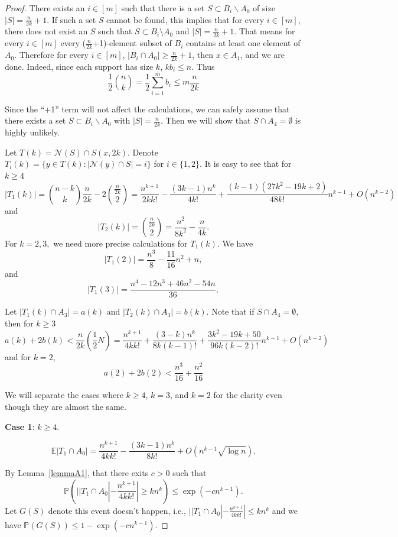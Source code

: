 \documentclass[reqno,11pt]{amsart}
\renewcommand{\leq}{\leqslant}
\renewcommand{\geq}{\geqslant}
\begin{document}
\begin{proof}
There exists an $i \in [m]$ such that there is a set $S \subset B_i \backslash A_0$ of size $|S|=\frac{n}{2k}+1$. If such a set $S$ cannot be found, this implies that for every $i \in [m]$, there does not exist an $S$ such that $S \subset B_i \setminus A_0$ and $|S|=\frac{n}{2k}+1$. That means for every $i \in [m]$ every ($\frac{n}{2k}$+1)-element subset of $B_i$ contains at least one element of $A_0$. Therefore for every $i \in [m]$, $|B_i \cap A_0| \geq \frac{n}{2k}+1$, then $x \in A_1$, and we are done. Indeed, since each support has size $k$, $kb_i \leq n$. Thus 
$$\frac{1}{2}\binom{n}{k}=\frac{1}{2}\sum_{i=1}^mb_i \leq m\frac{n}{2k}$$


Since the ``+1'' term will not affect the calculations, we can safely assume that there exists a set $S \subset B_i \backslash A_0$ with $|S|=\frac{n}{2k}$. Then we will show that $S \cap A_4 = \emptyset$ is highly unlikely.


Let $T(k)=\mathcal{N}(S) \cap S(x,2k)$. Denote $T_i(k)=\{y \in T(k): |\mathcal{N}(y) \cap S|=i\}$ for $i\in \{1,2\}$. It is easy to see that for $k \geq 4$
$$|T_1(k)|=\binom{n-k}{k}\frac{n}{2k}-2\binom{\frac{n}{2k}}{2}=\frac{n^{k+1}}{2k k!}-\frac{(3k-1)n^k}{4k!}+\frac{(k-1)(27k^2-19k+2)}{48k!}n^{k-1}+O(n^{k-2})$$ and 
$$|T_2(k)|=\binom{\frac{n}{2k}}{2}=\frac{n^2}{8k^2}-\frac{n}{4k}.$$
For $k=2,3,$ we need more precise calculations for $T_1(k)$. We have 
$$|T_1(2)|=\frac{n^3}{8}-\frac{11}{16}n^2+n,$$
and 
$$|T_1(3)|=\frac{n^4-12n^3+46n^2-54n}{36},$$


Let $|T_1(k) \cap A_3|=a(k)$ and $|T_2(k) \cap A_3|=b(k)$. Note that if $S \cap A_4=\emptyset$, then for $k \geq 3$ $$a(k)+2b(k) < \frac{n}{2k}\left(\frac{1}{2}N \right)=\frac{n^{k+1}}{4k k!}+\frac{(3-k)n^k}{8k(k-1)!}+\frac{3k^2-19k+50}{96k(k-2)!}n^{k-1}+O(n^{k-2})$$ and for $k=2$,
$$a(2)+2b(2) < \frac{n^3}{16}+\frac{n^2}{16}$$

We will separate the cases where $k \geq 4$, $k=3$, and $k=2$ for the clarity even though they are almost the same. 

\textbf{Case 1}: $k \geq 4$. 

$$\mathbb{E}|T_1 \cap A_0| =\frac{n^{k+1}}{4k k!}-\frac{(3k-1)n^k}{8k!}+O(n^{k-1}\sqrt{\log n}).$$

By Lemma~\ref{lemmaA1}, that there exits $c >0$ such that 
$$\mathbb{P}(||T_1 \cap A_0|-\frac{n^{k+1}}{4k k!}| \geq kn^k) \leq \exp(-cn^{k-1}).$$
Let $G(S)$ denote this event doesn't happen, i.e., $||T_1 \cap A_0|-\frac{n^{k+1}}{4k k!}| \leq kn^k $ and we have $\mathbb{P}(G(S)) \leq 1-\exp(-c n^{k-1})$.


\end{proof}
\end{document}
